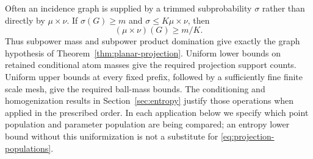 \begin{remark}
\label{rem:projection-incidence-laws}
Often an incidence graph is supplied by a trimmed subprobability
\(\sigma\) rather than directly by \(\mu\times\nu\).
If \(\sigma(G)\ge m\) and \(\sigma\le K\mu\times\nu\), then
\[
 (\mu\times\nu)(G)\ge m/K.
\]
Thus subpower mass and subpower product domination give exactly
the graph hypothesis of Theorem~\ref{thm:planar-projection}.
Uniform lower bounds on retained conditional atom masses give the
required projection support counts. Uniform upper bounds at every
fixed prefix, followed by a sufficiently fine finite scale mesh,
give the required ball-mass bounds. The conditioning and
homogenization results in Section~\ref{sec:entropy} justify those
operations when applied in the prescribed order. In each application
below we specify which point population and parameter population are
being compared; an entropy lower bound without this uniformization
is not a substitute for \eqref{eq:projection-populations}.
\end{remark}
